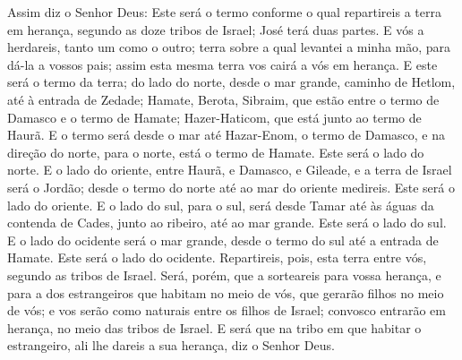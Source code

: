 Assim diz o Senhor Deus: Este será o termo conforme o qual
repartireis a terra em herança, segundo as doze tribos de Israel;
José terá duas partes. E vós a herdareis, tanto um como o
outro; terra sobre a qual levantei a minha mão, para dá-la a vossos
pais; assim esta mesma terra vos cairá a vós em herança. E
este será o termo da terra; do lado do norte, desde o mar grande,
caminho de Hetlom, até à entrada de Zedade; Hamate, Berota,
Sibraim, que estão entre o termo de Damasco e o termo de Hamate;
Hazer-Haticom, que está junto ao termo de Haurã. E o termo
será desde o mar até Hazar-Enom, o termo de Damasco, e na direção do
norte, para o norte, está o termo de Hamate. Este será o lado do
norte. E o lado do oriente, entre Haurã, e Damasco, e
Gileade, e a terra de Israel será o Jordão; desde o termo do norte
até ao mar do oriente medireis. Este será o lado do oriente.
E o lado do sul, para o sul, será desde Tamar até às águas da
contenda de Cades, junto ao ribeiro, até ao mar grande. Este será o
lado do sul. E o lado do ocidente será o mar grande, desde o
termo do sul até a entrada de Hamate. Este será o lado do ocidente.
Repartireis, pois, esta terra entre vós, segundo as tribos de
Israel. Será, porém, que a sorteareis para vossa herança, e
para a dos estrangeiros que habitam no meio de vós, que gerarão
filhos no meio de vós; e vos serão como naturais entre os filhos de
Israel; convosco entrarão em herança, no meio das tribos de Israel.
E será que na tribo em que habitar o estrangeiro, ali lhe
dareis a sua herança, diz o Senhor Deus.

\medskip

